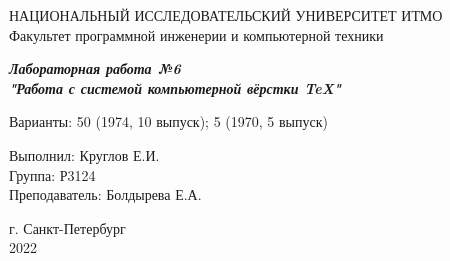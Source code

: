 \newpage
\begin{center}
\large НАЦИОНАЛЬНЫЙ ИССЛЕДОВАТЕЛЬСКИЙ УНИВЕРСИТЕТ ИТМО
\newline
\\
\normalsize Факультет программной инженерии и компьютерной техники
\vspace{5cm}

\Huge{
\textbf{\textit{Лабораторная работа №6 \\
"Работа с системой компьютерной вёрстки \TeX"}}}
\vspace{0.5cm}

\large{
Варианты: 50 (1974, 10 выпуск); 5 (1970, 5 выпуск)
}\vspace{6cm}

\end{center}

\large{
\begin{flushright}
Выполнил: Круглов Е.И.\\
Группа: Р3124\\
Преподаватель: Болдырева Е.А.
\end{flushright}}
\vspace{4cm}

\begin{center}
г. Санкт-Петербург \\
2022
\end{center}